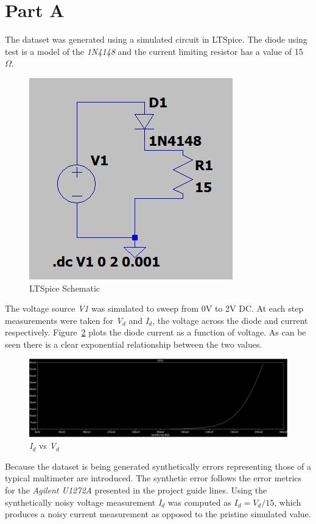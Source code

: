 \newpage
\section{Part A}
\label{sec:sec_a}
The dataset was generated using a simulated circuit in LTSpice. The diode using test is a model of the \textit{1N4148} and the current limiting resistor has a value of 15 $\Omega$. 

\begin{figure}[htpb]
	\centering
	\includegraphics{figures/lt_spice_diagram.JPG}
	\caption{LTSpice Schematic}
	\label{fig:lt_schematic}
\end{figure}

The voltage source \textit{V1} was simulated to sweep from 0V to 2V DC. At each step measurements were taken for \textit{V}$_{d}$ and \textit{I}$_{d}$, the voltage across the diode and current respectively. Figure~\ref{fig:lt_current} plots the diode current as a function of voltage. As can be seen there is a clear exponential relationship between the two values.

\begin{figure}[!htpb]
	\centering
	\includegraphics[width=\columnwidth]{figures/lt_spice_plot.JPG}
	\caption{\textit{I}$_{d}$ vs \textit{V}$_{d}$}
	\label{fig:lt_current}
\end{figure}

Because the dataset is being generated synthetically errors representing those of a typical multimeter are introduced. The synthetic error follows the error metrics for the \textit{Agilent U1272A} presented in the project guide lines. Using the synthetically noisy voltage measurement \textit{I}$_{d}$ was computed as $I_{d} = V_{d}/15$, which produces a noisy current measurement as opposed to the pristine simulated value.
\newpage
{}